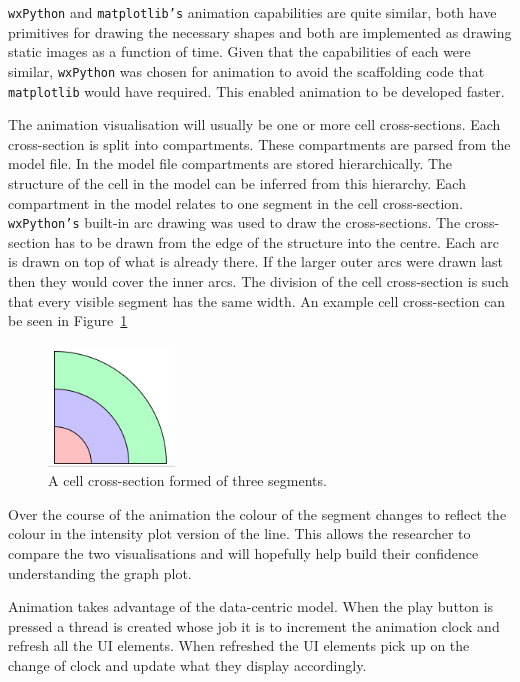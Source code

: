 \texttt{wxPython} and \texttt{matplotlib's} animation capabilities are quite similar, both have primitives for drawing the necessary shapes and both are implemented as drawing static images as a function of time.  Given that the capabilities of each were similar, \texttt{wxPython} was chosen for animation to avoid the scaffolding code that \texttt{matplotlib} would have required.  This enabled animation to be developed faster.

The animation visualisation will usually be one or more cell cross-sections.  Each cross-section is split into compartments. These compartments are parsed from the model file.  In the model file compartments are stored hierarchically.  The structure of the cell in the model can be inferred from this hierarchy.  Each compartment in the model relates to one segment in the cell cross-section.  \texttt{wxPython's} built-in arc drawing was used to draw the cross-sections.  The cross-section has to be drawn from the edge of the structure into the centre.  Each arc is drawn on top of what is already there.  If the larger outer arcs were drawn last then they would cover the inner arcs.  The division of the cell cross-section is such that every visible segment has the same width.  An example cell cross-section can be seen in Figure~\ref{fig:cell_segment}

\begin{figure}[h!]
    \centering
    \includegraphics[width=0.3\textwidth]{images/cell_segment.png}
    \caption{A cell cross-section formed of three segments.}
    \label{fig:cell_segment}
\end{figure}

Over the course of the animation the colour of the segment changes to reflect the colour in the intensity plot version of the line.  This allows the researcher to compare the two visualisations and will hopefully help build their confidence understanding the graph plot.

Animation takes advantage of the data-centric model.  When the play button is pressed a thread is created whose job it is to increment the animation clock and refresh all the \ac{UI} elements.  When refreshed the \ac{UI} elements pick up on the change of clock and update what they display accordingly.

